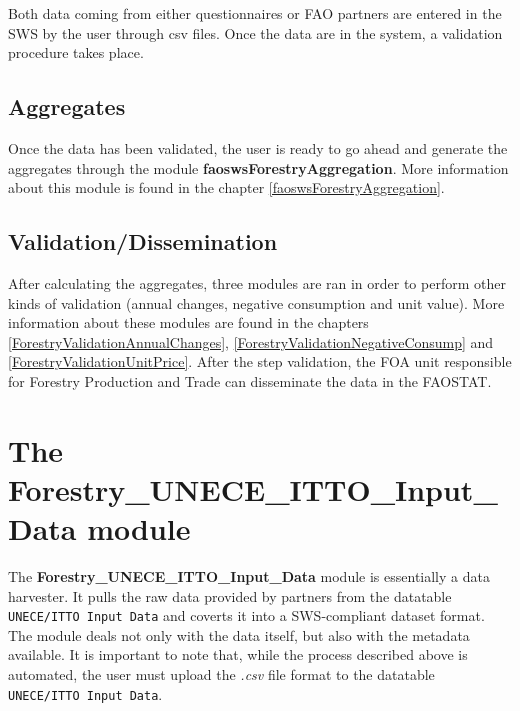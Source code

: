\documentclass[
]{book}
\begin{document}
Both data coming from either questionnaires or FAO partners are entered in the SWS by the user through csv files. Once the data are in the system, a validation procedure takes place.

\hypertarget{aggregates}{%
\section{\texorpdfstring{\textbf{Aggregates}}{Aggregates}}\label{aggregates}}

Once the data has been validated, the user is ready to go ahead and generate the aggregates through the module \textbf{faoswsForestryAggregation}. More information about this module is found in the chapter \ref{faoswsForestryAggregation}.

\hypertarget{validationdissemination}{%
\section{\texorpdfstring{\textbf{Validation/Dissemination}}{Validation/Dissemination}}\label{validationdissemination}}

After calculating the aggregates, three modules are ran in order to perform other kinds of validation (annual changes, negative consumption and unit value). More information about these modules are found in the chapters \ref{ForestryValidationAnnualChanges}, \ref{ForestryValidationNegativeConsump} and \ref{ForestryValidationUnitPrice}.
After the step validation, the FOA unit responsible for Forestry Production and Trade can disseminate the data in the FAOSTAT.

\hypertarget{ForestryUNECEITTOInputData}{%
\chapter{\texorpdfstring{\textbf{The Forestry\_UNECE\_ITTO\_Input\_Data module}}{The Forestry\_UNECE\_ITTO\_Input\_Data module}}\label{ForestryUNECEITTOInputData}}

The \textbf{Forestry\_UNECE\_ITTO\_Input\_Data} module is essentially a data harvester. It pulls the raw data provided by partners from the datatable \texttt{UNECE/ITTO\ Input\ Data} and coverts it into a SWS-compliant dataset format. The module deals not only with the data itself, but also with the metadata available.
It is important to note that, while the process described above is automated, the user must upload the \emph{.csv} file format to the datatable \texttt{UNECE/ITTO\ Input\ Data}.
\end{document}
